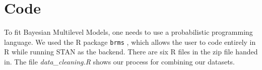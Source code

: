 \documentclass[12pt]{article}
\newcommand{\red}[1]{\textcolor{red}{#1}}
\newcommand{\blue}[1]{\textcolor{blue}{#1}}
\begin{document}



\section{Code}











To fit Bayesian Multilevel Models, one needs to use a probabilistic programming language. We used the R package \verb|brms| \parencite{brms}, which allows the user to code entirely in R while running STAN as the backend. There are six R files in the zip file handed in. The file \textit{data\_cleaning.R} shows our process for combining our datasets.
\end{document}
